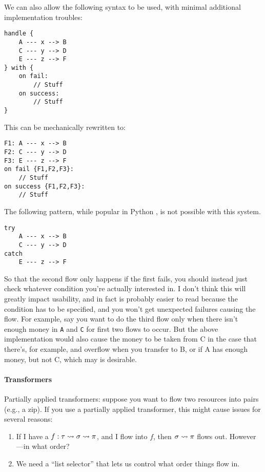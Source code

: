 \documentclass[10pt]{article}
\begin{document}
We can also allow the following syntax to be used, with minimal additional implementation troubles:
\begin{lstlisting}
handle {
    A --- x --> B
    C --- y --> D
    E --- z --> F
} with {
    on fail:
        // Stuff
    on success:
        // Stuff
}
\end{lstlisting}

This can be mechanically rewritten to:
\begin{lstlisting}
F1: A --- x --> B
F2: C --- y --> D
F3: E --- z --> F
on fail {F1,F2,F3}:
    // Stuff
on success {F1,F2,F3}:
    // Stuff
\end{lstlisting}

The following pattern, while popular in Python , is not possible with this system.
\begin{lstlisting}
try
    A --- x --> B
    C --- y --> D
catch
    E --- z --> F
\end{lstlisting}

So that the second flow only happens if the first fails, you should instead just check whatever condition you're actually interested in.
I don't think this will greatly impact usability, and in fact is probably easier to read because the condition has to be specified, and you won't get unexpected failures causing the flow.
For example, say you want to do the third flow only when there isn't enough money in \lstinline{A} and \lstinline{C} for first two flows to occur.
But the above implementation would also cause the money to be taken from C in the case that there's, for example, and overflow when you transfer to B, or if A has enough money, but not C, which may is desirable.

\paragraph{Transformers}

Partially applied transformers: suppose you want to flow two resources into pairs (e.g., a zip).
If you use a partially applied transformer, this might cause issues for several reasons:
\begin{enumerate}
    \item If I have a $f : \tau \rightsquigarrow \sigma \rightsquigarrow \pi$, and I flow into $f$, then $\sigma \rightsquigarrow \pi$ flows out.
        However---in what order?

    \item We need a ``list selector'' that lets us control what order things flow in.
\end{enumerate}
\end{document}
